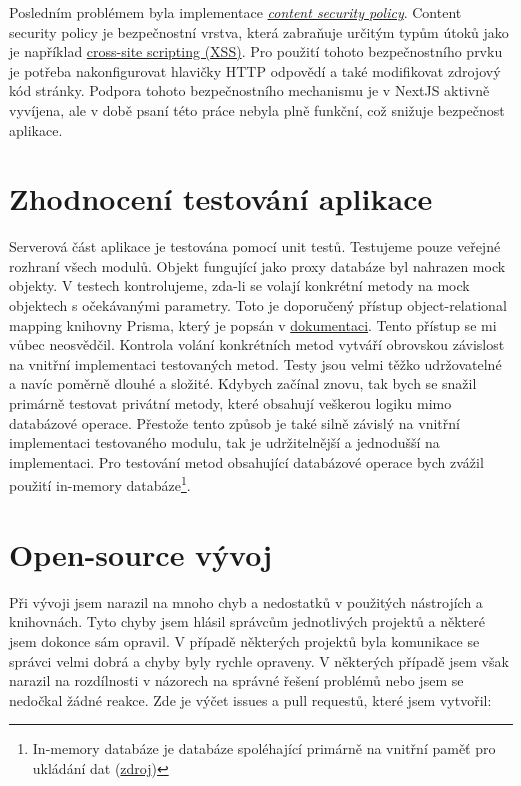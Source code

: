 Posledním problémem byla implementace \textit{\href{https://developer.mozilla.org/en-US/docs/Web/HTTP/CSP}{content security policy}}.
Content security policy je bezpečnostní vrstva, která zabraňuje určitým typům útoků jako je například \href{https://developer.mozilla.org/en-US/docs/Glossary/Cross-site_scripting}{cross-site scripting (XSS)}.
Pro použití tohoto bezpečnostního prvku je potřeba nakonfigurovat hlavičky HTTP odpovědí a také modifikovat zdrojový kód stránky.
Podpora tohoto bezpečnostního mechanismu je v NextJS aktivně vyvíjena, ale v době psaní této práce nebyla plně funkční, což snižuje bezpečnost aplikace.


\section{Zhodnocení testování aplikace}\label{sec:zhodnoceni-testovani-aplikace}

Serverová část aplikace je testována pomocí unit testů.
Testujeme pouze veřejné rozhraní všech modulů.
Objekt fungující jako proxy databáze byl nahrazen mock objekty.
V testech kontrolujeme, zda-li se volají konkrétní metody na mock objektech s očekávanými parametry.
Toto je doporučený přístup object-relational mapping knihovny Prisma, který je popsán v \href{https://www.prisma.io/docs/guides/testing/unit-testing}{dokumentaci}.
Tento přístup se mi vůbec neosvědčil.
Kontrola volání konkrétních metod vytváří obrovskou závislost na vnitřní implementaci testovaných metod.
Testy jsou velmi těžko udržovatelné a navíc poměrně dlouhé a složité.
Kdybych začínal znovu, tak bych se snažil primárně testovat privátní metody, které obsahují veškerou logiku mimo databázové operace.
Přestože tento způsob je také silně závislý na vnitřní implementaci testovaného modulu, tak je udržitelnější a jednodušší na implementaci.
Pro testování metod obsahující databázové operace bych zvážil použití in-memory databáze\footnote{In-memory databáze je databáze spoléhající primárně na vnitřní paměť pro ukládání dat (\href{https://aws.amazon.com/nosql/in-memory/}{zdroj})}.

\section{Open-source vývoj}\label{sec:open-source-vyvoj}

Při vývoji jsem narazil na mnoho chyb a nedostatků v použitých nástrojích a knihovnách.
Tyto chyby jsem hlásil správcům jednotlivých projektů a některé jsem dokonce sám opravil.
V případě některých projektů byla komunikace se správci velmi dobrá a chyby byly rychle opraveny.
V některých případě jsem však narazil na rozdílnosti v názorech na správné řešení problémů nebo jsem se nedočkal žádné reakce.
Zde je výčet issues a pull requestů, které jsem vytvořil:

